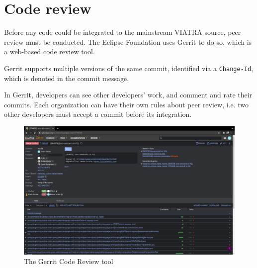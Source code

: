 \documentclass[11pt,a4paper,oneside]{report}
\begin{document}
\section{Code review}
Before any code could be integrated to the mainstream VIATRA source, peer review
must be conducted. The Eclipse Foundation uses Gerrit to do so, which is a
web-based code review tool.

Gerrit supports multiple versions of the same commit, identified via a
\texttt{Change-Id}, which is denoted in the commit message.

In Gerrit, developers can see other developers' work, and comment and rate their
commits. Each organization can have their own rules about peer review, i.e. two
other developers must accept a commit before its integration.

\begin{figure}[ht]
\centering
\includegraphics[width=150mm, keepaspectratio]{figures/gerrit.png}
\caption{The Gerrit Code Review tool}
\label{fig:gerrit}
\end{figure}


\listoffigures{}
\listoftables{}

\label{page:last}
\end{document}

